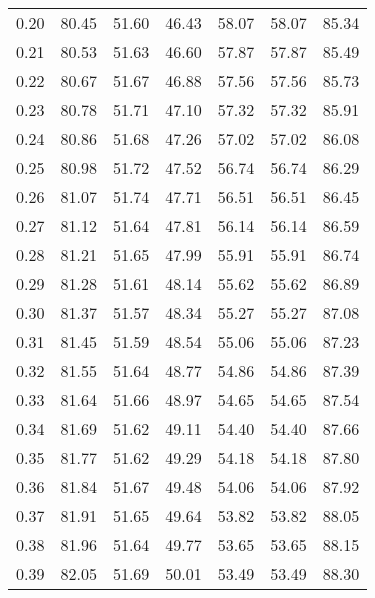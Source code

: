 \begin{tabular}{|c|c|c|c|c|c|c|}
      0.20 &     80.45 &     51.60 &      46.43 &   58.07 &      58.07 &         85.34 \\
      0.21 &     80.53 &     51.63 &      46.60 &   57.87 &      57.87 &         85.49 \\
      0.22 &     80.67 &     51.67 &      46.88 &   57.56 &      57.56 &         85.73 \\
      0.23 &     80.78 &     51.71 &      47.10 &   57.32 &      57.32 &         85.91 \\
      0.24 &     80.86 &     51.68 &      47.26 &   57.02 &      57.02 &         86.08 \\
      0.25 &     80.98 &     51.72 &      47.52 &   56.74 &      56.74 &         86.29 \\
      0.26 &     81.07 &     51.74 &      47.71 &   56.51 &      56.51 &         86.45 \\
      0.27 &     81.12 &     51.64 &      47.81 &   56.14 &      56.14 &         86.59 \\
      0.28 &     81.21 &     51.65 &      47.99 &   55.91 &      55.91 &         86.74 \\
      0.29 &     81.28 &     51.61 &      48.14 &   55.62 &      55.62 &         86.89 \\
      0.30 &     81.37 &     51.57 &      48.34 &   55.27 &      55.27 &         87.08 \\
      0.31 &     81.45 &     51.59 &      48.54 &   55.06 &      55.06 &         87.23 \\
      0.32 &     81.55 &     51.64 &      48.77 &   54.86 &      54.86 &         87.39 \\
      0.33 &     81.64 &     51.66 &      48.97 &   54.65 &      54.65 &         87.54 \\
      0.34 &     81.69 &     51.62 &      49.11 &   54.40 &      54.40 &         87.66 \\
      0.35 &     81.77 &     51.62 &      49.29 &   54.18 &      54.18 &         87.80 \\
      0.36 &     81.84 &     51.67 &      49.48 &   54.06 &      54.06 &         87.92 \\
      0.37 &     81.91 &     51.65 &      49.64 &   53.82 &      53.82 &         88.05 \\
      0.38 &     81.96 &     51.64 &      49.77 &   53.65 &      53.65 &         88.15 \\
      0.39 &     82.05 &     51.69 &      50.01 &   53.49 &      53.49 &         88.30 \\

\end{tabular}
